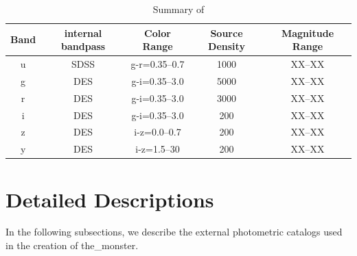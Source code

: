 \begin{table}[htbp]
    \centering
    \label{tab:summary}
    
    \begin{tabular}{|c | c | c | c | c |}
        \hline
        \textbf{Band} & \textbf{internal bandpass} & \textbf{Color Range} & \textbf{Source Density} & \textbf{Magnitude Range} \\
        \hline
        u             &  SDSS                      & g-r=0.35--0.7        & 1000                    & XX--XX                   \\
        g             & DES                        & g-i=0.35--3.0        & 5000                    & XX--XX                     \\
        r             & DES                        & g-i=0.35--3.0        & 3000                    & XX--XX                     \\
        i             & DES                        & g-i=0.35--3.0        & 200                     & XX--XX                      \\
        z             & DES                        & i-z=0.0--0.7         & 200                     & XX--XX                     \\
        y             & DES                        & i-z=1.5--30          & 200                     & XX--XX                      \\
        \hline
    \end{tabular}
    \caption{Summary of \monster}
\end{table}




\section{Detailed Descriptions}
\label{sec:details}
In the following subsections, we describe the external photometric catalogs used in the creation of the\_monster.

